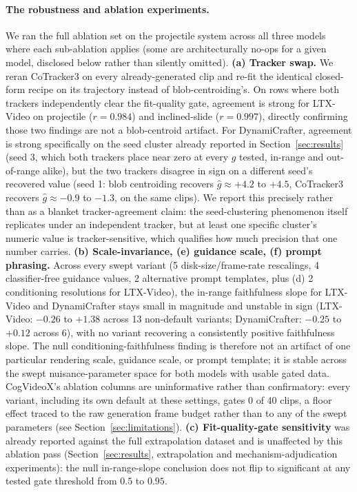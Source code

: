 \documentclass[10pt,twocolumn,letterpaper]{article}
\begin{document}
\paragraph{The robustness and ablation experiments.}
We ran the full ablation set on the projectile system across all three
models where each sub-ablation applies (some are architecturally no-ops
for a given model, disclosed below rather than silently omitted).
\textbf{(a) Tracker swap.} We reran CoTracker3 \citep{karaev2023cotracker}
on every already-generated clip and re-fit the identical closed-form
recipe on its trajectory instead of blob-centroiding's. On rows where
both trackers independently clear the fit-quality gate, agreement is
strong for LTX-Video on projectile ($r=0.984$) and inclined-slide
($r=0.997$), directly confirming those two findings are not a
blob-centroid artifact. For DynamiCrafter, agreement is strong specifically
on the seed cluster already reported in Section~\ref{sec:results} (seed 3,
which both trackers place near zero at every $g$ tested, in-range and
out-of-range alike), but the two trackers disagree in sign on a different
seed's recovered value (seed 1: blob centroiding recovers $\hat g\approx
+4.2$ to $+4.5$, CoTracker3 recovers $\hat g\approx-0.9$ to $-1.3$, on the
same clips). We report this precisely rather than as a blanket
tracker-agreement claim: the seed-clustering phenomenon itself replicates
under an independent tracker, but at least one specific cluster's numeric
value is tracker-sensitive, which qualifies how much precision that one
number carries. \textbf{(b) Scale-invariance, (e) guidance scale, (f)
prompt phrasing.} Across every swept variant (5 disk-size/frame-rate
rescalings, 4 classifier-free guidance values, 2 alternative prompt
templates, plus (d) 2 conditioning resolutions for LTX-Video), the
in-range faithfulness slope for LTX-Video and DynamiCrafter stays small in
magnitude and unstable in sign (LTX-Video: $-0.26$ to $+1.38$ across 13
non-default variants; DynamiCrafter: $-0.25$ to $+0.12$ across 6), with no
variant recovering a consistently positive faithfulness slope. The null
conditioning-faithfulness finding is therefore not an artifact of one
particular rendering scale, guidance scale, or prompt template; it is
stable across the swept nuisance-parameter space for both models with
usable gated data. CogVideoX's ablation columns are uninformative rather
than confirmatory: every variant, including its own default at these
settings, gates 0 of 40 clips, a floor effect traced to the raw generation
frame budget rather than to any of the swept parameters (see
Section~\ref{sec:limitations}). \textbf{(c) Fit-quality-gate sensitivity}
was already reported against the full extrapolation dataset and is
unaffected by this ablation pass (Section~\ref{sec:results}, extrapolation and mechanism-adjudication experiments): the
null in-range-slope conclusion does not flip to significant at any tested
gate threshold from $0.5$ to $0.95$.
\end{document}
